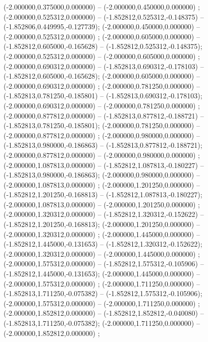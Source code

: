  (-2.000000,0.375000,0.000000) -- (-2.000000,0.450000,0.000000) ;
 (-2.000000,0.525312,0.000000) -- (-1.852812,0.525312,-0.148375) -- (-1.852806,0.449995,-0.127739);
 (-2.000000,0.450000,0.000000) -- (-2.000000,0.525312,0.000000) ;
 (-2.000000,0.605000,0.000000) -- (-1.852812,0.605000,-0.165628) -- (-1.852812,0.525312,-0.148375);
 (-2.000000,0.525312,0.000000) -- (-2.000000,0.605000,0.000000) ;
 (-2.000000,0.690312,0.000000) -- (-1.852813,0.690312,-0.178103) -- (-1.852812,0.605000,-0.165628);
 (-2.000000,0.605000,0.000000) -- (-2.000000,0.690312,0.000000) ;
 (-2.000000,0.781250,0.000000) -- (-1.852813,0.781250,-0.185801) -- (-1.852813,0.690312,-0.178103);
 (-2.000000,0.690312,0.000000) -- (-2.000000,0.781250,0.000000) ;
 (-2.000000,0.877812,0.000000) -- (-1.852813,0.877812,-0.188721) -- (-1.852813,0.781250,-0.185801);
 (-2.000000,0.781250,0.000000) -- (-2.000000,0.877812,0.000000) ;
 (-2.000000,0.980000,0.000000) -- (-1.852813,0.980000,-0.186863) -- (-1.852813,0.877812,-0.188721);
 (-2.000000,0.877812,0.000000) -- (-2.000000,0.980000,0.000000) ;
 (-2.000000,1.087813,0.000000) -- (-1.852812,1.087813,-0.180227) -- (-1.852813,0.980000,-0.186863);
 (-2.000000,0.980000,0.000000) -- (-2.000000,1.087813,0.000000) ;
 (-2.000000,1.201250,0.000000) -- (-1.852812,1.201250,-0.168813) -- (-1.852812,1.087813,-0.180227);
 (-2.000000,1.087813,0.000000) -- (-2.000000,1.201250,0.000000) ;
 (-2.000000,1.320312,0.000000) -- (-1.852812,1.320312,-0.152622) -- (-1.852812,1.201250,-0.168813);
 (-2.000000,1.201250,0.000000) -- (-2.000000,1.320312,0.000000) ;
 (-2.000000,1.445000,0.000000) -- (-1.852812,1.445000,-0.131653) -- (-1.852812,1.320312,-0.152622);
 (-2.000000,1.320312,0.000000) -- (-2.000000,1.445000,0.000000) ;
 (-2.000000,1.575312,0.000000) -- (-1.852812,1.575312,-0.105906) -- (-1.852812,1.445000,-0.131653);
 (-2.000000,1.445000,0.000000) -- (-2.000000,1.575312,0.000000) ;
 (-2.000000,1.711250,0.000000) -- (-1.852813,1.711250,-0.075382) -- (-1.852812,1.575312,-0.105906);
 (-2.000000,1.575312,0.000000) -- (-2.000000,1.711250,0.000000) ;
 (-2.000000,1.852812,0.000000) -- (-1.852812,1.852812,-0.040080) -- (-1.852813,1.711250,-0.075382);
 (-2.000000,1.711250,0.000000) -- (-2.000000,1.852812,0.000000) ;
